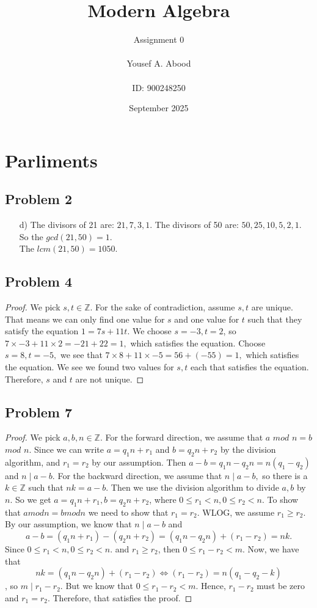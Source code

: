 \documentclass[a4paper,12pt]{article}
\title{Modern Algebra}
\author{Assignment 0\\ \\ Yousef A. Abood\\ \\ ID: 900248250}
\date{September 2025}
\begin{document}
\maketitle
\noindent\makebox[\linewidth]{\rule{15cm}{0.4pt}}
\section{Parliments}
\subsection*{Problem 2}
\begin{itemize}
    \item [d)] The divisors of 21 are: $21,7,3,1$. The divisors of 50 are: $50, 25, 10, 5, 2, 1$. So the $gcd(21,50)=1.$\\ The $lcm(21, 50)=1050.$
\end{itemize}
\subsection*{Problem 4} \begin{proof}
We pick $s,t \in \mathbb{Z}.$ For the sake of contradiction, assume $s,t$ are unique. That means we can only find one value for $s$ and one value for $t$ such that they satisfy the equation $1=7s+11t.$ We choose $s=-3, t=2$, so $7\times -3+11 \times 2=-21+22=1,$ which satisfies the equation. Choose $s=8, t=-5,$ we see that $7\times 8+11 \times -5=56+(-55)=1,$ which satisfies the equation. We see we found two values for $s,t$ each that satisfies the equation. Therefore, $s$ and $t$ are not unique.
\end{proof}
\subsection*{Problem 7} \begin{proof}
    We pick $a,b,n \in \mathbb{Z}.$ For the forward direction, we assume that $a$ $ mod$ $n = b$ $mod$ $n$. Since we can write $a=q_1n+r_1$ and $b=q_2n+r_2$ by the division algorithm, and $r_1=r_2$ by our assumption. Then $a-b=q_1n-q_2n=n(q_1-q_2)$ and $n\mid a-b.$ For the backward direction, we assume that $n\mid a-b,$ so there is a $k \in \mathbb{Z}$ such that $nk=a-b.$ Then we use the division algorithm to divide $a,b$ by $n$. So we get $a=q_1n+r_1, b=q_2n+r_2$, where $0\leq r_1 < n, 0 \leq r_2 <n.$ To show that $a mod n = b mod n$ we need to show that $r_1=r_2.$ WLOG, we assume $r_1\geq r_2$. By our assumption, we know that $n\mid a-b$ and \[a-b=(q_1n+r_1)-(q_2n+r_2)=(q_1n-q_2n)+(r_1-r_2)=nk.\]
Since $0\leq r_1 < n, 0 \leq r_2 <n.$ and $r_1\geq r_2$, then $0 \leq r_1-r_2<m$. Now, we have that \[nk=(q_1n-q_2n)+(r_1-r_2)\iff (r_1-r_2)=n(q_1-q_2-k)\], so $m\mid r_1-r_2.$ But we know that $0 \leq r_1-r_2<m.$ Hence, $r_1-r_2$ must be zero and $r_1=r_2.$ Therefore, that satisfies the proof.
\end{proof}
\end{document}
